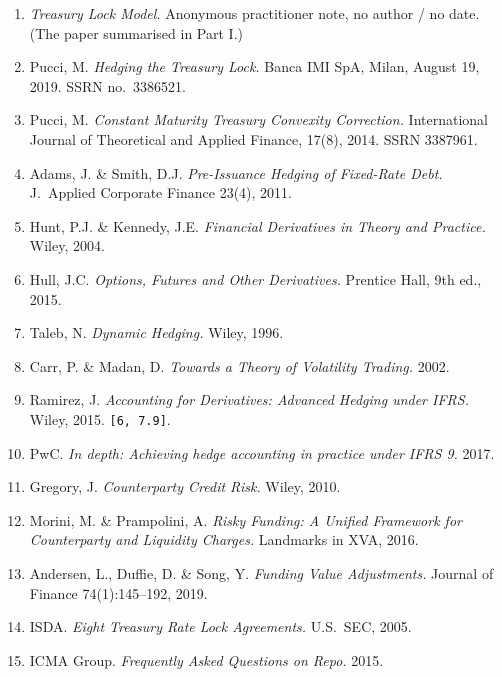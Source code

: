 \documentclass[11pt]{article}
\theoremstyle{definition}
\begin{document}
\begin{enumerate}[leftmargin=2.2em,itemsep=1pt]
\item \textit{Treasury Lock Model.} Anonymous practitioner note, no
      author / no date.
      (The paper summarised in Part I.)
\item Pucci, M. \textit{Hedging the Treasury Lock.} Banca IMI SpA,
      Milan, August 19, 2019. SSRN no.\ 3386521.
\item Pucci, M. \textit{Constant Maturity Treasury Convexity Correction.}
      International Journal of Theoretical and Applied Finance, 17(8),
      2014. SSRN 3387961.
\item Adams, J. \& Smith, D.J. \textit{Pre-Issuance Hedging of
      Fixed-Rate Debt.} J.\ Applied Corporate Finance 23(4), 2011.
\item Hunt, P.J. \& Kennedy, J.E. \textit{Financial Derivatives in
      Theory and Practice.} Wiley, 2004.
\item Hull, J.C. \textit{Options, Futures and Other Derivatives.}
      Prentice Hall, 9th ed., 2015.
\item Taleb, N. \textit{Dynamic Hedging.} Wiley, 1996.
\item Carr, P. \& Madan, D. \textit{Towards a Theory of Volatility
      Trading.} 2002.
\item Ramirez, J. \textit{Accounting for Derivatives: Advanced Hedging
      under IFRS.} Wiley, 2015. \texttt{[6, 7.9]}.
\item PwC. \textit{In depth: Achieving hedge accounting in practice
      under IFRS 9.} 2017.
\item Gregory, J. \textit{Counterparty Credit Risk.} Wiley, 2010.
\item Morini, M. \& Prampolini, A. \textit{Risky Funding: A Unified
      Framework for Counterparty and Liquidity Charges.}
      Landmarks in XVA, 2016.
\item Andersen, L., Duffie, D. \& Song, Y. \textit{Funding Value
      Adjustments.} Journal of Finance 74(1):145--192, 2019.
\item ISDA. \textit{Eight Treasury Rate Lock Agreements.} U.S.\ SEC,
      2005.
\item ICMA Group. \textit{Frequently Asked Questions on Repo.} 2015.
\end{enumerate}
\end{document}
